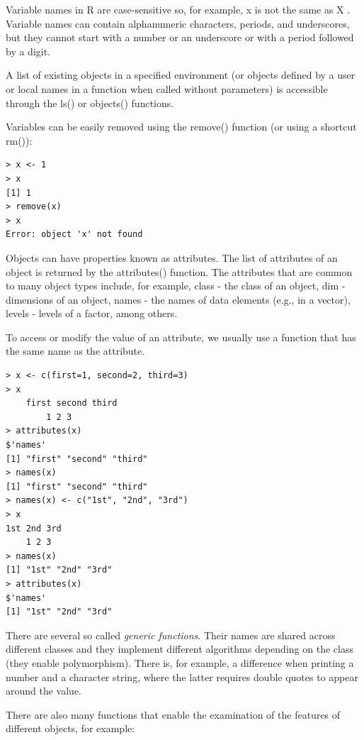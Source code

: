 \documentclass[11pt,openany,executivepaper]{book}
\begin{document}
Variable names in R are case-sensitive so, for example, x is not the same as X . Variable names can contain alphanumeric characters, periods, and underscores, but they cannot start with a number or an underscore or with a period followed by a digit.

A list of existing objects in a specified environment (or objects defined by a user or local names in a function when called without parameters) is accessible through the ls() or objects() functions.

Variables can be easily removed using the remove() function (or using a shortcut rm()):

\begin{verbatim}
> x <- 1
> x
[1] 1
> remove(x)
> x
Error: object 'x' not found
\end{verbatim}

Objects can have properties known as attributes. The list of attributes of an object is returned by the attributes() function. The attributes that are common to many object types include, for example, class - the class of an object, dim - dimensions of an object, names - the names of data elements (e.g., in a vector), levels - levels of a factor, among others.

To access or modify the value of an attribute, we usually use a function that has the same name as the attribute.

\begin{verbatim}
> x <- c(first=1, second=2, third=3)
> x
    first second third
        1 2 3
> attributes(x)
$'names'
[1] "first" "second" "third"
> names(x)
[1] "first" "second" "third"
> names(x) <- c("1st", "2nd", "3rd")
> x
1st 2nd 3rd
    1 2 3
> names(x)
[1] "1st" "2nd" "3rd"
> attributes(x)
$'names'
[1] "1st" "2nd" "3rd"
\end{verbatim}

There are several so called \textit{generic functions}. Their names are shared across different classes and they implement different algorithms depending on the class (they enable polymorphism). There is, for example, a difference when printing a number and a character string, where the latter requires double quotes to appear around the value.

There are also many functions that enable the examination of the features of different objects, for example:
\end{document}
